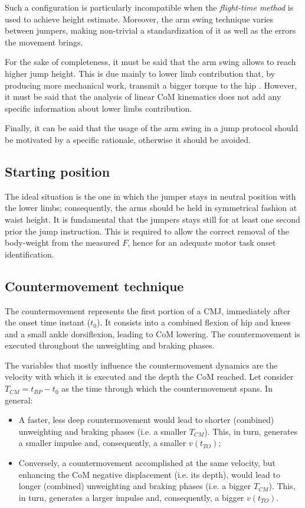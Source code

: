 Such a configuration is particularly incompatible when the \textit{flight-time method} is used to achieve height estimate. Moreover, the arm swing technique varies between jumpers, making non-trivial a standardization of it as well as the errors the movement brings. 

For the sake of completeness, it must be said that the arm swing allows to reach higher jump height. This is due mainly to lower limb contribution that, by producing more mechanical work, transmit a bigger torque to the hip \citep{hara_comparison_2008, harman_effects_1990, slinde_test-retest_2008}. However, it must be said that the analysis of linear CoM kinematics does not add any specific information about lower limbs contribution. 

Finally, it can be said that the usage of the arm swing in a jump protocol should be motivated by a specific rationale, otherwise it should be avoided.

\subsection{Starting position}
The ideal situation is the one in which the jumper stays in neutral position with the lower limbs; consequently, the arms should be held in symmetrical fashion at waist height. It is fundamental that the jumpers stays still for at least one second prior the jump instruction. This is required to allow the correct removal of the body-weight from the measured $F$, hence for an adequate motor task onset identification.

\subsection{Countermovement technique}
The countermovement represents the first portion of a CMJ, immediately after the onset time instant ($t_{0}$). It consists into a combined flexion of hip and knees and a small ankle dorsiflexion, leading to CoM lowering. The countermovement is executed throughout the unweighting and braking phases. 

The variables that mostly influence the countermovement dynamics are the velocity with which it is executed and the depth the CoM reached. Let consider $T_{CM} = t_{BP} - t_0$ as the time through which the countermovement spans. In general:

\begin{itemize}
	\item A faster, less deep countermovement would lead to shorter (combined) unweighting and braking phases (i.e. a smaller $T_{CM}$). This, in turn, generates a smaller impulse and, consequently, a smaller $v(t_{TO})$;
	\item Conversely, a countermovement accomplished at the same velocity, but enhancing the CoM negative displacement (i.e. its depth), would lead to longer (combined) unweighting and braking phases (i.e. a bigger $T_{CM}$). This, in turn, generates a larger impulse and, consequently, a bigger $v(t_{TO})$. 
\end{itemize}

